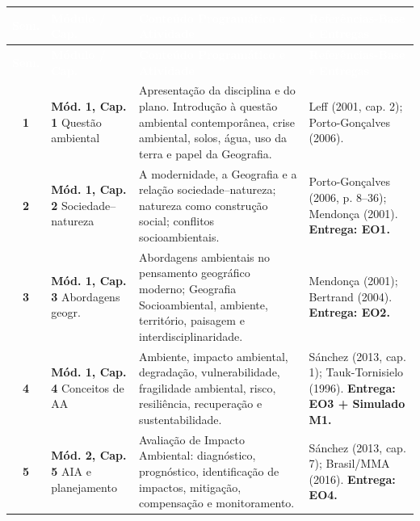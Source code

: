 \renewcommand{\arraystretch}{1.22}
\small
\begin{longtable}{@{}c p{2.9cm} p{5.5cm} p{4.4cm}@{}}
  \toprule
  \rowcolor{uefsNavy}
  \textcolor{white}{\bfseries Sem.} & \textcolor{white}{\bfseries Módulo / Cap.} & \textcolor{white}{\bfseries Conteúdo Programático e Atividade} & \textcolor{white}{\bfseries Referências-Base e Entregas} \\
  \midrule
  \endfirsthead
  \toprule
  \rowcolor{uefsNavy}
  \textcolor{white}{\bfseries Sem.} & \textcolor{white}{\bfseries Módulo / Cap.} & \textcolor{white}{\bfseries Conteúdo Programático e Atividade} & \textcolor{white}{\bfseries Referências-Base e Entregas} \\
  \midrule
  \endhead
  \bottomrule
  \endfoot

  \textbf{1} & \textbf{Mód. 1, Cap. 1} \newline Questão ambiental & Apresentação da disciplina e do plano. Introdução à questão ambiental contemporânea, crise ambiental, solos, água, uso da terra e papel da Geografia. & Leff (2001, cap. 2); Porto-Gonçalves (2006). \\
  \rowcolor{bgGray}
  \textbf{2} & \textbf{Mód. 1, Cap. 2} \newline Sociedade–natureza & A modernidade, a Geografia e a relação sociedade–natureza; natureza como construção social; conflitos socioambientais. & Porto-Gonçalves (2006, p. 8–36); Mendonça (2001). \textbf{\color{uefsAlert}Entrega: EO1.} \\
  \textbf{3} & \textbf{Mód. 1, Cap. 3} \newline Abordagens geogr. & Abordagens ambientais no pensamento geográfico moderno; Geografia Socioambiental, ambiente, território, paisagem e interdisciplinaridade. & Mendonça (2001); Bertrand (2004). \textbf{\color{uefsAlert}Entrega: EO2.} \\
  \rowcolor{bgGray}
  \textbf{4} & \textbf{Mód. 1, Cap. 4} \newline Conceitos de AA & Ambiente, impacto ambiental, degradação, vulnerabilidade, fragilidade ambiental, risco, resiliência, recuperação e sustentabilidade. & Sánchez (2013, cap. 1); Tauk-Tornisielo (1996). \textbf{\color{uefsAlert}Entrega: EO3 + Simulado M1.} \\
  \midrule
  \textbf{5} & \textbf{Mód. 2, Cap. 5} \newline AIA e planejamento & Avaliação de Impacto Ambiental: diagnóstico, prognóstico, identificação de impactos, mitigação, compensação e monitoramento. & Sánchez (2013, cap. 7); Brasil/MMA (2016). \textbf{\color{uefsAlert}Entrega: EO4.} \\

\end{longtable}
